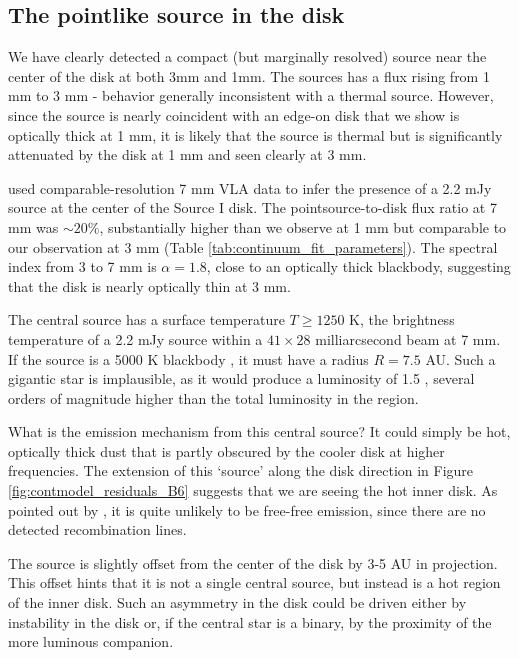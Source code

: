 \documentclass[twocolumn]{aastex61}
\begin{document}
\subsection{The pointlike source in the disk}
\label{sec:ptsrc}
We have clearly detected a compact (but marginally resolved) source near the
center of the disk at both 3mm and 1mm.  The sources has a flux rising from 1
mm to 3 mm - behavior generally inconsistent with a thermal source.  However, since the
source is nearly coincident with an edge-on disk that we show is optically
thick at 1 mm, it is likely that the source is thermal but is significantly
attenuated by the disk at 1 mm and seen clearly at 3 mm.

\citet{Reid2007a} used comparable-resolution 7 mm VLA data to infer
the presence of a 2.2 mJy source at the center of the Source I disk.
The pointsource-to-disk flux ratio at 7 mm was $\sim20\%$, substantially
higher than we observe at 1 mm but comparable to our
observation at 3 mm (Table \ref{tab:continuum_fit_parameters}).  
The spectral index from 3 to 7 mm is $\alpha=1.8$, close to an optically
thick blackbody, suggesting that the disk is nearly optically thin at 3 mm.

The central source has a surface temperature $T\geq1250$ K, the brightness
temperature of a 2.2 mJy source within a $41\times28$ milliarcsecond beam at 7
mm.  If the source is a 5000 K blackbody \citep[e.g.,][]{Testi2010a}, it must
have a radius $R=7.5$ AU.  Such a gigantic star is implausible, as it would
produce a luminosity of 1.5 \lsun, several orders of magnitude higher
than the total luminosity in the region.

What is the emission mechanism from this central source?
It could simply be hot, optically thick dust that is partly obscured by the
cooler disk at higher frequencies.  The  extension of this `source'
along the disk direction in Figure \ref{fig:contmodel_residuals_B6}
suggests that we are seeing the hot inner disk.
As pointed out by \citet{Plambeck2016a}, it is quite unlikely to be
free-free emission, since there are no detected recombination lines.

The source is slightly offset from the center of the disk by 3-5 AU in
projection.  This offset hints that it is not a single central source, but
instead is a hot region of the inner disk.  Such an asymmetry in the disk could
be driven either by instability in the disk or, if the central star is a
binary, by the proximity of the more luminous companion.
\end{document}
